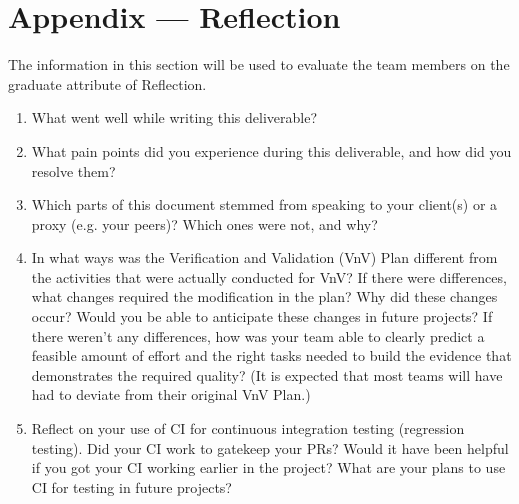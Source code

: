 \documentclass[12pt, titlepage]{article}
\begin{document}
\newpage{}
\section*{Appendix --- Reflection}

The information in this section will be used to evaluate the team members on the
graduate attribute of Reflection.



\begin{enumerate}
  \item What went well while writing this deliverable? 
  \item What pain points did you experience during this deliverable, and how
    did you resolve them?
  \item Which parts of this document stemmed from speaking to your client(s) or
  a proxy (e.g. your peers)? Which ones were not, and why?
  \item In what ways was the Verification and Validation (VnV) Plan different
  from the activities that were actually conducted for VnV?  If there were
  differences, what changes required the modification in the plan?  Why did
  these changes occur?  Would you be able to anticipate these changes in future
  projects?  If there weren't any differences, how was your team able to clearly
  predict a feasible amount of effort and the right tasks needed to build the
  evidence that demonstrates the required quality?  (It is expected that most
  teams will have had to deviate from their original VnV Plan.)
  \item Reflect on your use of CI for continuous integration testing (regression
  testing). Did your CI work to gatekeep your PRs?  Would it have been helpful
  if you got your CI working earlier in the project?  What are your plans to use
  CI for testing in future projects?
\end{enumerate}
    
\end{document}
